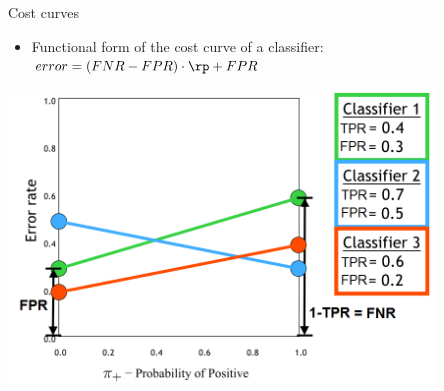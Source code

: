 \documentclass[11pt,compress,t,notes=noshow, xcolor=table]{beamer}
\begin{document}
\begin{vbframe}{Cost curves}

\begin{itemize}
  \item Functional form of the cost curve of a classifier:
  $error = (FNR - FPR) \cdot \rp + FPR$ %
\end{itemize}
\begin{center}
\includegraphics[width=0.85\textwidth]{figure_man/cost-curves-3.png}
\end{center}






\end{vbframe}
\end{document}
